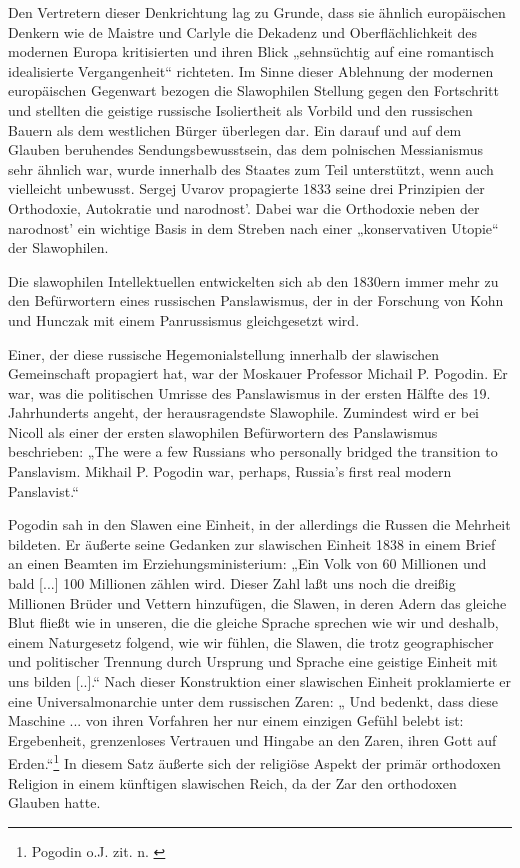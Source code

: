 \documentclass{../../sem_paper}
\begin{document}
Den Vertretern dieser Denkrichtung lag zu Grunde, dass sie ähnlich europäischen Denkern
wie de Maistre und Carlyle die Dekadenz und Oberflächlichkeit des modernen Europa
kritisierten und ihren Blick „sehnsüchtig auf eine romantisch idealisierte Vergangenheit“\autocite[120]{kohn}
 richteten. Im Sinne dieser Ablehnung der modernen europäischen
Gegenwart bezogen die Slawophilen Stellung gegen den Fortschritt und stellten die geistige
russische Isoliertheit als Vorbild und den russischen Bauern als dem westlichen Bürger
überlegen dar. Ein darauf und auf dem Glauben beruhendes Sendungsbewusstsein, das dem
polnischen Messianismus sehr ähnlich war, wurde innerhalb des Staates zum Teil unterstützt,
wenn auch vielleicht unbewusst. Sergej Uvarov propagierte 1833 seine drei Prinzipien der
Orthodoxie, Autokratie und narodnost'. Dabei war die Orthodoxie neben der narodnost' ein
wichtige Basis in dem Streben nach einer „konservativen Utopie“\autocite[408]{walicki} der
Slawophilen.

Die slawophilen Intellektuellen entwickelten sich ab den 1830ern immer mehr zu den
Befürwortern eines russischen Panslawismus, der in der Forschung von Kohn\autocite{kohn} und
Hunczak\autocite{hunczak} mit einem Panrussismus gleichgesetzt wird.

Einer, der diese russische Hegemonialstellung innerhalb der slawischen Gemeinschaft
propagiert hat, war der Moskauer Professor Michail P. Pogodin. Er war, was die politischen
Umrisse des Panslawismus in der ersten Hälfte des 19. Jahrhunderts angeht, der
herausragendste Slawophile. Zumindest wird er bei Nicoll\autocite[232]{nicoll} als einer der ersten
slawophilen Befürwortern des Panslawismus beschrieben: „The were a few Russians who
personally bridged the transition to Panslavism. Mikhail P. Pogodin war, perhaps, Russia's
first real modern Panslavist.“

Pogodin sah in den Slawen eine Einheit, in der allerdings die Russen die Mehrheit bildeten. Er
äußerte seine Gedanken zur slawischen Einheit 1838 in einem Brief an einen Beamten im
Erziehungsministerium: „Ein Volk von 60 Millionen und bald [...] 100 Millionen zählen wird.
Dieser Zahl laßt uns noch die dreißig Millionen Brüder und Vettern hinzufügen, die Slawen,
in deren Adern das gleiche Blut fließt wie in unseren, die die gleiche Sprache sprechen wie
wir und deshalb, einem Naturgesetz folgend, wie wir fühlen, die Slawen, die trotz
geographischer und politischer Trennung durch Ursprung und Sprache eine geistige Einheit
mit uns bilden [..].“ Nach dieser Konstruktion einer slawischen Einheit proklamierte er eine
Universalmonarchie unter dem russischen Zaren: „ Und bedenkt, dass diese Maschine ... von
ihren Vorfahren her nur einem einzigen Gefühl belebt ist: Ergebenheit, grenzenloses Vertrauen
und Hingabe an den Zaren, ihren Gott auf Erden.“\footnote{Pogodin o.J. zit. n. \autocite[128]{kohn}}
In diesem Satz äußerte sich der religiöse Aspekt der primär orthodoxen Religion in einem
künftigen slawischen Reich, da der Zar den orthodoxen Glauben hatte.
\end{document}
